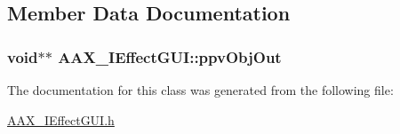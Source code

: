 \subsection{Member Data Documentation}
\hypertarget{a00098_afcb1be35487e2a63f50ef2bc56f74c3a}{}
\subsubsection[{ppv\+Obj\+Out}]{\setlength{\rightskip}{0pt plus 5cm}void$\ast$$\ast$ A\+A\+X\+\_\+\+I\+Effect\+G\+U\+I\+::ppv\+Obj\+Out}\label{a00098_afcb1be35487e2a63f50ef2bc56f74c3a}


The documentation for this class was generated from the following file\+:\begin{DoxyCompactItemize}
\item 
\hyperlink{a00246}{A\+A\+X\+\_\+\+I\+Effect\+G\+U\+I.\+h}\end{DoxyCompactItemize}
